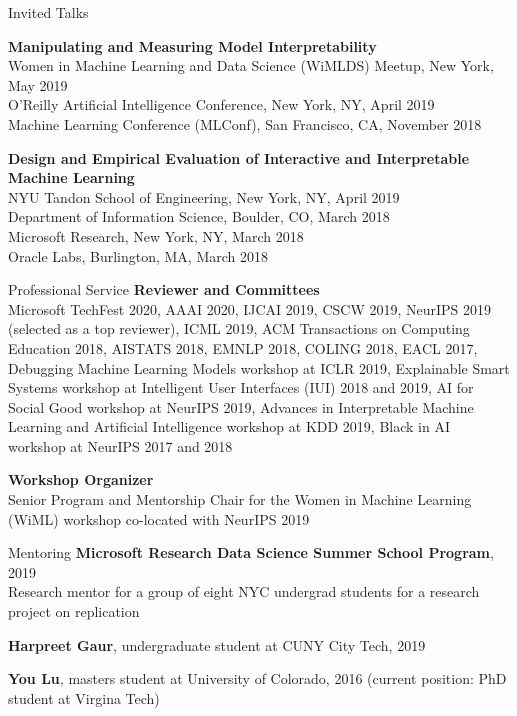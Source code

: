 \documentclass{resume} %
\begin{document}
\begin{rSection}{Invited Talks}

\textbf{Manipulating and Measuring Model Interpretability}\\
Women in Machine Learning and Data Science (WiMLDS) Meetup, New York, May 2019\\
O'Reilly Artificial Intelligence Conference, New York, NY, April 2019\\
Machine Learning Conference (MLConf), San Francisco, CA, November 2018

\textbf{Design and Empirical Evaluation of Interactive and Interpretable Machine Learning}\\
NYU Tandon School of Engineering, New York, NY, April 2019\\
Department of Information Science, Boulder, CO, March 2018\\
Microsoft Research, New York, NY, March 2018\\
Oracle Labs, Burlington, MA, March 2018
\end{rSection}

\begin{rSection}{Professional Service}
\textbf{Reviewer and Committees}\\
Microsoft TechFest 2020,
AAAI 2020,
IJCAI 2019,
CSCW 2019,
NeurIPS 2019 (selected as a top reviewer),
ICML 2019,
ACM Transactions on Computing Education 2018,
AISTATS 2018,
EMNLP 2018,
COLING 2018,
EACL 2017,
Debugging Machine Learning Models workshop at ICLR 2019,
Explainable Smart Systems workshop at Intelligent User Interfaces (IUI) 2018 and 2019,
AI for Social Good workshop at NeurIPS 2019,
Advances in Interpretable Machine Learning and Artificial Intelligence workshop at KDD 2019,
Black in AI workshop at NeurIPS 2017 and 2018

\textbf{Workshop Organizer}\\
Senior Program and Mentorship Chair for the Women in Machine Learning (WiML) workshop co-located with NeurIPS 2019
\end{rSection}


\begin{rSection}{Mentoring}
\textbf{Microsoft Research Data Science Summer School Program}, 2019\\
Research mentor for a group of eight NYC undergrad students for a research project on replication

\textbf{Harpreet Gaur}, undergraduate student at CUNY City Tech, 2019

\textbf{You Lu}, masters student at University of Colorado, 2016 (current position: PhD student at Virgina Tech)

\end{rSection}
\end{document}
